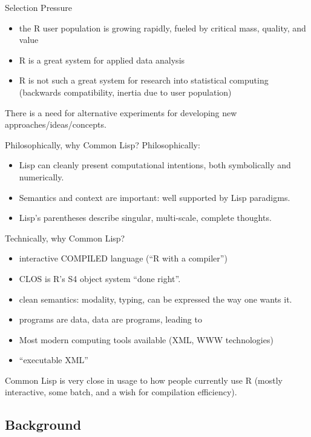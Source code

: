 \documentclass{beamer}
\begin{document}
\begin{frame}{Selection Pressure}
  \begin{itemize}
  \item the R user population is growing rapidly, fueled by critical
    mass, quality, and value
  \item R is a great system for applied data analysis
  \item R is not such a great system for research into statistical
    computing (backwards compatibility, inertia due to user population)
  \end{itemize}
  There is a need for alternative experiments for developing new
  approaches/ideas/concepts. 
\end{frame}

\begin{frame}{Philosophically, why Common Lisp?}
  Philosophically:
  \begin{itemize}
  \item Lisp can cleanly present computational intentions, both
    symbolically and numerically.
  \item Semantics and context are important: well supported by Lisp
    paradigms.
  \item Lisp's parentheses describe singular, multi-scale,
    \alert{complete thoughts}.
  \end{itemize}

\end{frame}

\begin{frame}{Technically, why Common Lisp?}
  \begin{itemize}
  \item interactive COMPILED language (``R with a compiler'')
  \item CLOS is R's S4 object system ``done right''.
  \item clean semantics: modality, typing, can be expressed the way
    one wants it.
  \item programs are data, data are programs, leading to
  \item Most modern computing tools available (XML, WWW technologies)
  \item ``executable XML''
  \end{itemize}
  Common Lisp is very close in usage to how people currently use R
  (mostly interactive, some batch, and a wish for compilation efficiency).
\end{frame}

\subsection{Background}
\end{document}
